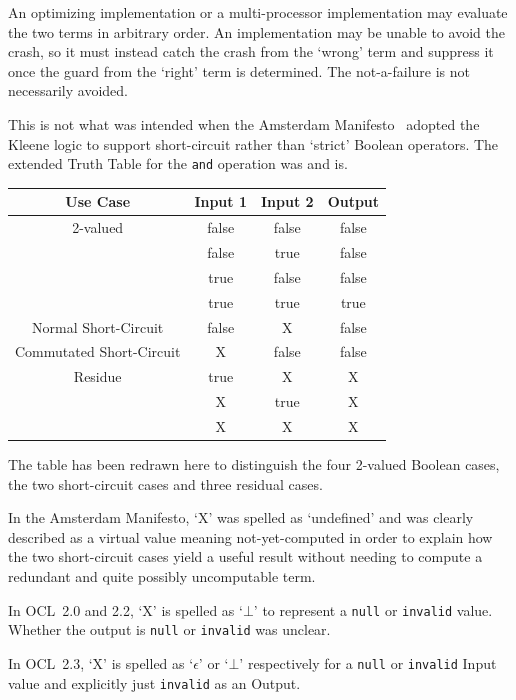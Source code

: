 \documentclass{jot}
\begin{document}
An optimizing implementation or a multi-processor implementation may evaluate the two terms in arbitrary order. An implementation may be unable to avoid the crash, so it must instead catch the crash from the `wrong' term and suppress it once the guard from the `right' term is determined. The not-a-failure is not necessarily avoided.

This is not what was intended when the Amsterdam Manifesto~\cite{OCL-Amsterdam} adopted the Kleene logic to support short-circuit rather than `strict' Boolean operators. The extended Truth Table for the \verb$and$ operation was and is.

\begin{center}
	\begin{tabular}{|c||c|c||c|}
		\hline
		Use Case & Input 1 & Input 2 & Output \\
		\hline
		\hline
		2-valued & false & false & false \\
		& false & true & false \\
		&  true & false & false \\
		& true & true & true \\
		\hline
		Normal Short-Circuit & false & X & false \\
		Commutated Short-Circuit & X & false & false \\
		\hline
		Residue & true & X & X \\
		& X & true & X \\
		& X & X & X \\
		\hline
	\end{tabular}
\end{center}

The table has been redrawn here to distinguish the four 2-valued Boolean cases, the two short-circuit cases and three residual cases.

In the Amsterdam Manifesto, `X' was spelled as `undefined' and was clearly described as a virtual value meaning not-yet-computed in order to explain how the two short-circuit cases yield a useful result without needing to compute a redundant and quite possibly uncomputable term.

In OCL~2.0 and 2.2, `X' is spelled as `$\bot$' to represent a \verb$null$ or \verb$invalid$ value. Whether the output is \verb$null$ or \verb$invalid$ was unclear.

In OCL~2.3, `X' is spelled as `$\epsilon$' or `$\bot$' respectively for a \verb$null$ or \verb$invalid$ Input value and explicitly just \verb$invalid$ as an Output.
\end{document}
